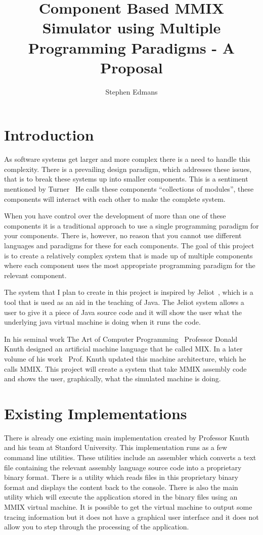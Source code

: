 \documentclass[11pt]{article} %
\title{Component Based MMIX Simulator using Multiple Programming Paradigms - A Proposal}
\author{Stephen Edmans}
\date{} %
\begin{document}
\maketitle
\newpage
\tableofcontents
\newpage
\listoffigures
\newpage
\section{Introduction}
As software systems get larger and more complex there is a need to handle this complexity. There is a prevailing design paradigm, which addresses these issues, that is to break these systems up into smaller components.  This is a sentiment mentioned by Turner~\cite{turner:why}  He calls these components ``collections of modules'', these components will interact with each other to make the complete system. 

When you have control over the development of more than one of these components it is a traditional approach to use a single programming paradigm for your components. There is, however, no reason that you cannot use different languages and paradigms for these for each components. The goal of this project is to create a relatively complex system that is made up of multiple components where each component uses the most appropriate programming paradigm for the relevant component.

The system that I plan to create in this project is inspired by Jeliot~\cite{jeliot:ref}, which is a tool that is used as an aid in the teaching of Java. The Jeliot system allows a user to give it a piece of Java source code and it will show the user what the underlying java virtual machine is doing when it runs the code.

In his seminal work The Art of Computer Programming~\cite{knuth:aocp1} Professor Donald Knuth designed an artificial machine language that he called MIX. In a later volume of his work~\cite{knuth:aocp2} Prof. Knuth updated this machine architecture, which he calls MMIX. This project will create a system that take MMIX assembly code and shows the user, graphically, what the simulated machine is doing.

\section{Existing Implementations}
There is already one existing main implementation created by Professor Knuth and his team at Stanford University. This implementation runs as a few command line utilities.  These utilities include an assembler which converts a text file containing the relevant assembly language source code into a proprietary binary format.  There is a utility which reads files in this proprietary binary format and displays the content back to the console.  There is also the main utility which will execute the application stored in the binary files using an MMIX virtual machine.  It is possible to get the virtual machine to output some tracing information but it does not have a graphical user interface and it does not allow you to step through the processing of the application.  
\end{document}
